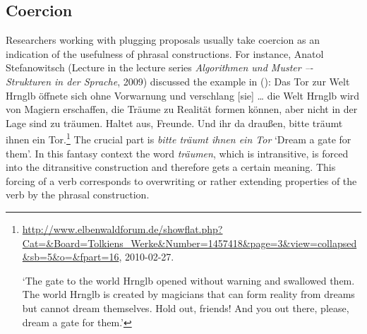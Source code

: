 \addlines
\subsection{Coercion}
\label{coercion-sec}

Researchers working with plugging proposals usually take coercion as an indication of the usefulness of phrasal
constructions. For instance, Anatol Stefanowitsch (Lecture in the lecture series \emph{Algorithmen und Muster –-
  Strukturen in der Sprache}, 2009) discussed the example in ():
\ea
Das Tor zur Welt Hrnglb öffnete sich ohne Vorwarnung
und verschlang [sie] \ldots{} die Welt Hrnglb wird von Magiern
erschaffen, die Träume zu Realität formen können, aber
nicht in der Lage sind zu träumen. Haltet aus, Freunde.
Und ihr da draußen, bitte träumt ihnen ein Tor.\footnote{%
\url{http://www.elbenwaldforum.de/showflat.php?Cat=&Board=Tolkiens_Werke&Number=1457418&page=3&view=collapsed&sb=5&o=&fpart=16}, 2010-02-27.

`The gate to the world Hrnglb opened without warning and swallowed them. The world Hrnglb is created
by magicians that can form reality from dreams but cannot dream themselves. Hold out, friends! And
you out there, please, dream a gate for them.'
}
\z
The crucial part is \emph{bitte träumt ihnen ein Tor} `Dream a gate for them'. In this fantasy
context the word \emph{träumen}, which is intransitive, is forced into the ditransitive construction
and therefore gets a certain meaning. This forcing of a verb corresponds to overwriting or rather extending properties
of the verb by the phrasal construction.


